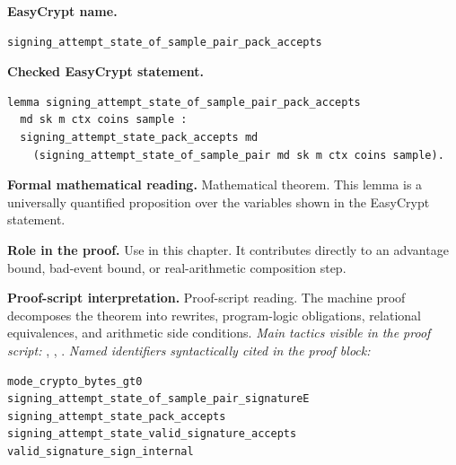 \begin{formaltheorem}
\noindent\textbf{EasyCrypt name.}
\begin{lstlisting}[language=EasyCrypt,basicstyle=\ttfamily\scriptsize]
signing_attempt_state_of_sample_pair_pack_accepts
\end{lstlisting}
\noindent\textbf{Checked EasyCrypt statement.}
\begin{lstlisting}[language=EasyCrypt,basicstyle=\ttfamily\scriptsize]
lemma signing_attempt_state_of_sample_pair_pack_accepts
  md sk m ctx coins sample :
  signing_attempt_state_pack_accepts md
    (signing_attempt_state_of_sample_pair md sk m ctx coins sample).
\end{lstlisting}
\noindent\textbf{Formal mathematical reading.}
Mathematical theorem. This lemma is a universally quantified proposition over the variables shown in the EasyCrypt statement.

\noindent\textbf{Role in the proof.}
Use in this chapter. It contributes directly to an advantage bound, bad-event bound, or real-arithmetic composition step.

\noindent\textbf{Proof-script interpretation.}
Proof-script reading. The machine proof decomposes the theorem into rewrites, program-logic obligations, relational equivalences, and arithmetic side conditions.
\emph{Main tactics visible in the proof script:} , , .
\emph{Named identifiers syntactically cited in the proof block:}
\begin{lstlisting}[language=EasyCrypt,basicstyle=\ttfamily\scriptsize]
mode_crypto_bytes_gt0
signing_attempt_state_of_sample_pair_signatureE
signing_attempt_state_pack_accepts
signing_attempt_state_valid_signature_accepts
valid_signature_sign_internal
\end{lstlisting}

\end{formaltheorem}

